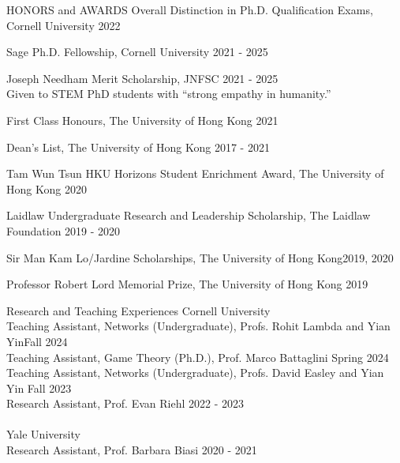\documentclass{resume} %
\begin{document}
\begin{rSection}{HONORS and AWARDS}
Overall Distinction in Ph.D. Qualification Exams, Cornell University \hfill 2022

Sage Ph.D. Fellowship, Cornell University \hfill 2021 - 2025

Joseph Needham Merit Scholarship, JNFSC \hfill 2021 - 2025 \\
\-\hspace{1em} Given to STEM PhD students with ``strong empathy in humanity.'' 

First Class Honours, The University of Hong Kong \hfill 2021

Dean's List, The University of Hong Kong \hfill 2017 - 2021

Tam Wun Tsun HKU Horizons Student Enrichment Award, The University of Hong Kong \hfill 2020

Laidlaw Undergraduate Research and Leadership Scholarship, The Laidlaw Foundation \hfill 2019 - 2020

Sir Man Kam Lo/Jardine Scholarships, The University of Hong Kong\hfill 2019, 2020

Professor Robert Lord Memorial Prize, The University of Hong Kong \hfill 2019 

\end{rSection}


\begin{rSection}{Research and Teaching Experiences}
Cornell University \\
\-\hspace{1em} Teaching Assistant, Networks (Undergraduate), Profs. Rohit Lambda and Yian Yin\hfill Fall 2024 \\
\-\hspace{1em} Teaching Assistant, Game Theory (Ph.D.), Prof. Marco Battaglini \hfill Spring 2024 \\
\-\hspace{1em} Teaching Assistant, Networks (Undergraduate), Profs. David Easley and Yian Yin \hfill Fall 2023 \\
\-\hspace{1em} Research Assistant, Prof. Evan Riehl \hfill 2022 - 2023 \\
\\
Yale University \\
\-\hspace{1em} Research Assistant, Prof. Barbara Biasi \hfill 2020 - 2021
\end{rSection}
\end{document}
